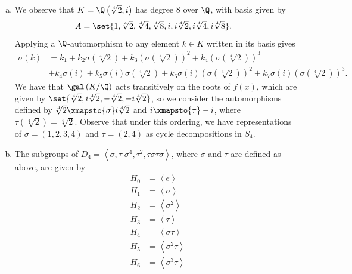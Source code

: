 \documentclass[10pt]{mypackage}
\begin{document}
\begin{solution}\hfill
  \begin{enumerate}[(a)]
    \item We observe that $K = \Q\left( \sqrt[4]{2},i \right)$ has degree $8$ over $\Q$, with basis given by
      \begin{align*}
        A &= \set{1,\sqrt[4]{2},\sqrt[4]{4},\sqrt[4]{8},i,i\sqrt[4]{2},i\sqrt[4]{4},i\sqrt[4]{8}}.
      \end{align*}
      Applying a $\Q$-automorphism to any element $k\in K$ written in its basis gives
      \begin{align*}
        \sigma\left( k \right) &= k_1 + k_2\sigma\left( \sqrt[4]{2} \right) + k_3\left( \sigma\left( \sqrt[4]{2} \right) \right)^2 + k_4\left( \sigma\left( \sqrt[4]{2} \right) \right)^{3}\\
                               &+ k_4\sigma\left( i \right) + k_5\sigma\left( i \right)\sigma\left( \sqrt[4]{2} \right) + k_6 \sigma\left( i \right)\left( \sigma\left( \sqrt[4]{2} \right) \right)^2 + k_7 \sigma\left( i \right)\left( \sigma\left( \sqrt[4]{2} \right) \right)^3.
      \end{align*}
      We have that $\gal\left( K/\Q \right)$ acts transitively on the roots of $f(x)$, which are given by $\set{\sqrt[4]{2},i\sqrt[4]{2},-\sqrt[4]{2},-i\sqrt[4]{2}}$, so we consider the automorphisms defined by $\sqrt[4]{2}\xmapsto{\sigma}i\sqrt[4]{2}$ and $i\xmapsto{\tau}-i$, where $\tau\left( \sqrt[4]{2} \right) = \sqrt[4]{2}$. Observe that under this ordering, we have representations of $\sigma = \left( 1,2,3,4 \right)$ and $\tau = \left( 2,4 \right)$ as cycle decompositions in $S_4$.
    \item The subgroups of $D_4 = \left\langle \sigma,\tau|\sigma^4,\tau^2,\tau\sigma\tau\sigma \right\rangle$, where $\sigma$ and $\tau$ are defined as above, are given by
      \begin{align*}
        H_0 &= \left\langle e \right \rangle\\
        H_1 &= \left\langle \sigma \right\rangle\\
        H_2 &= \left\langle \sigma^2 \right\rangle\\
        H_3 &= \left\langle \tau \right\rangle\\
        H_4 &= \left\langle \sigma\tau \right\rangle\\
        H_5 &= \left\langle \sigma^2\tau \right\rangle\\
        H_6 &= \left\langle \sigma^3\tau \right\rangle\\

\end{align*}
\end{enumerate}
\end{solution}
\end{document}

